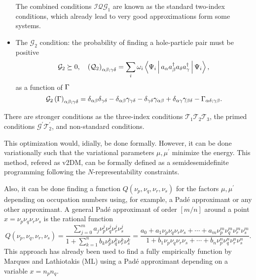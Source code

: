 \begin{itemize}
        The combined conditions $\mathcal{IQG_1}$ are known as the standard
        two-index conditions, which already lead to very good approximations
        form some systems.

    \item The $\mathcal{G}_2$ condition: the probability of finding a 
        hole-particle pair must be positive
        \begin{equation}
            \mathcal{G}_2 \succeq 0, \quad
            \left( \mathcal{Q}_2 \right)_{\alpha \beta;\gamma \delta} =
            \sum_{i} \omega_i 
            \Braket{\Psi_i | a_{\alpha} a_{\beta}^{\dagger} 
            a_{\delta} a_{\gamma}^{\dagger} | \Psi_i},
        \end{equation}
        as a function of $\Gamma$
        \begin{equation}
            \mathcal{G}_2\left( \Gamma \right)_{\alpha\beta;\gamma\delta} =
            \delta_{\alpha \beta } \delta_{\gamma \delta} - 
            \delta_{\alpha \beta } \gamma_{\gamma \delta} - 
            \delta_{\gamma \delta } \gamma_{\alpha \beta} +
            \delta_{\alpha \gamma } \gamma_{\beta \delta} -
            \Gamma_{\alpha \delta ; \gamma \beta}
            .
        \end{equation}
\end{itemize}

There are stronger conditions as the three-index conditions $\mathcal{T}_1 \mathcal{T}_2 \mathcal{T}_3$,
the primed conditions
$\mathcal{G^{\prime}} \mathcal{T}_2^{\prime}$, and non-standard conditions.


This optimization would, idially, be done formally.
However, it can be done variationally such that the variational parameters
$\mu,\mu^{\prime}$ minimize the energy.
This method, refered as v2DM, can be formally defined as a semidesemidefinite
programming following the $N$-representability constraints.

Also, it can be done finding a function 
$Q\left( \nu_p, \nu_q, \nu_r, \nu_s \right)$ for the factors $\mu,\mu^{\prime}$
depending on occupation numbers using, for example,
a Padé approximant or any other approximant.
A general Padé approximant of order $\left[ m / n \right]$ around a point 
$x=\nu_p \nu_q \nu_r \nu_s$ is the rational function 
\begin{equation}
    Q\left( \nu_p, \nu_q, \nu_r, \nu_s \right) =
    \frac{
        \sum_{j = 0}^{m} a_j \nu_p^{j} \nu_q^{j} \nu_r^{j} \nu_s^{j}
    }{
        1 + \sum_{k=1}^{n} b_k \nu_p^{k} \nu_q^{k} \nu_r^{k} \nu_s^{k}
    } =
    \frac{
        a_0 + a_1 \nu_p \nu_q \nu_r \nu_s + \cdots + a_m \nu_p^{m} \nu_q^{m} \nu_r^{m} \nu_s^{m}
    }{
        1 + b_1 \nu_p \nu_q \nu_r \nu_s + \cdots + b_n \nu_p^{n} \nu_q^{n} \nu_r^{n} \nu_s^{n}
    }
    .
\end{equation}
This approach has already been used to find a fully empirically function by Marques
and Lathiotakis (ML) using a Padé approximant
depending on a variable $x = n_p n_q$.

